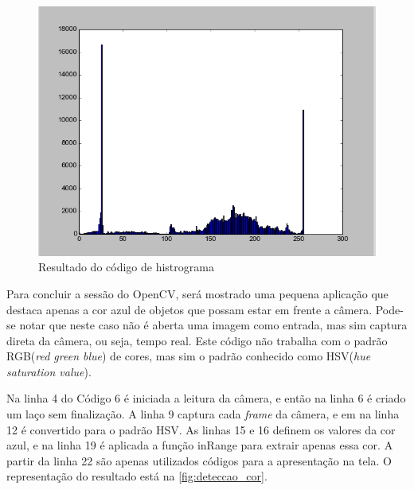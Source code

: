 

\begin{figure}[htbp]
\caption{\label{fig:resultado_histograma}Resultado do código de histrograma}
\begin{center}
\includegraphics[width=.9\textwidth]{figuras/f5c3.png}
\end{center}
\end{figure} 

Para concluir a sessão do OpenCV, será mostrado uma pequena aplicação que destaca apenas a cor azul de objetos que possam estar em frente a câmera. Pode-se notar que neste caso não é aberta uma imagem como entrada, mas sim captura direta da câmera, ou seja, tempo real. Este código não trabalha com o padrão RGB(\textit{red green blue}) de cores, mas sim o padrão conhecido como HSV(\textit{hue saturation value}). 

Na linha 4 do Código 6 é iniciada a leitura da câmera, e então na linha 6 é criado um laço sem finalização. A linha 9 captura cada \textit{frame} da câmera, e em na linha 12 é convertido para o padrão HSV. As linhas 15 e 16 definem os valores da cor azul, e na linha 19 é aplicada a função inRange para extrair apenas essa cor. A partir da linha 22 são apenas utilizados códigos para a apresentação na tela. O representação do resultado está na \autoref{fig:deteccao_cor}.



